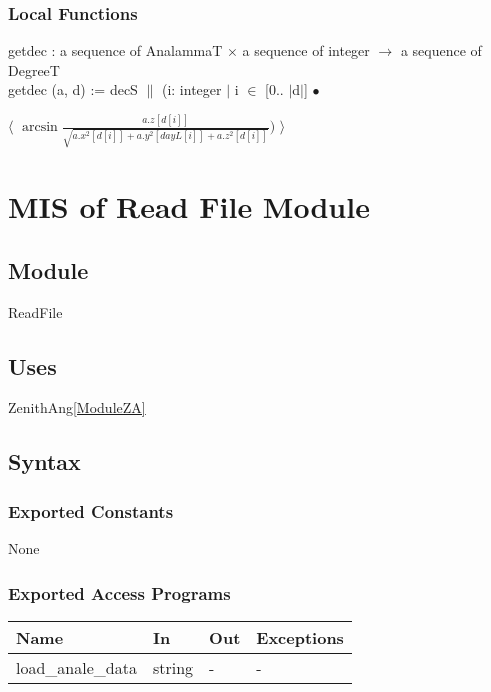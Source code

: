 \documentclass[12pt, titlepage]{article}
\begin{document}
\subsubsection{Local Functions}
getdec : a sequence of AnalammaT $\times$ a sequence of integer $\rightarrow$ a sequence of DegreeT\\
getdec (a, d) := decS $\|$ (i: integer $|$ i $\in$ [0.. $|$d$|$] $\bullet$ 
\begin{center}\large
$\langle$ $\arcsin \frac{a.z [d[ i ] ]}{ \sqrt{a.x^2 [ d[ i ] ] + a.y^2 [ dayL[ i ] ] + a.z^2 [ d[ i ] ]}}) $ $\rangle$
\end{center}

\newpage

\section{MIS of Read File Module} \label{ModuleR} 

\subsection{Module}
ReadFile


\subsection{Uses}
ZenithAng\ref{ModuleZA}


\subsection{Syntax}

\subsubsection{Exported Constants}
None

\subsubsection{Exported Access Programs}

\begin{center}
\begin{tabular}{p{3cm} p{3cm} p{3cm} p{2cm}}
\hline
\textbf{Name} & \textbf{In} & \textbf{Out} & \textbf{Exceptions} \\
\hline 
load\_anale\_data & string & - & -\\


\hline
\end{tabular}
\end{center}
\end{document}
